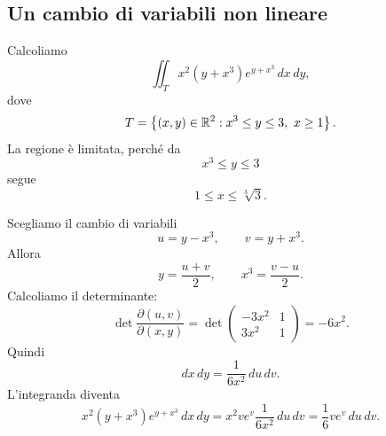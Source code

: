 \documentclass[a4paper]{article}
\begin{document}
\subsection{Un cambio di variabili non lineare}

\begin{snippetexample}{}
    Calcoliamo
    \[
        \iint_T x^2(y+x^3)e^{y+x^3}\,dx\,dy,
    \]
    dove
    \[
        T=
        \left\{
            (x,y)\in\mathbb{R}^2:
            x^3\leq y\leq 3,
            \ x\geq 1
        \right\}.
    \]
    La regione è limitata, perché da
    \[
        x^3\leq y\leq 3
    \]
    segue
    \[
        1\leq x\leq \sqrt[3]{3}.
    \]

    \begin{center}
    \end{center}

    Scegliamo il cambio di variabili
    \[
        u=y-x^3,
        \qquad
        v=y+x^3.
    \]
    Allora
    \[
        y=\frac{u+v}{2},
        \qquad
        x^3=\frac{v-u}{2}.
    \]
    Calcoliamo il determinante:
    \[
        \det
        \frac{\partial(u,v)}{\partial(x,y)}
        =
        \det
        \begin{pmatrix}
            -3x^2 & 1\\
            3x^2 & 1
        \end{pmatrix}
        =
        -6x^2.
    \]
    Quindi
    \[
        dx\,dy
        =
        \frac{1}{6x^2}\,du\,dv.
    \]
    L'integranda diventa
    \[
        x^2(y+x^3)e^{y+x^3}\,dx\,dy
        =
        x^2ve^v\frac{1}{6x^2}\,du\,dv
        =
        \frac{1}{6}ve^v\,du\,dv.
    \]


\end{snippetexample}
\end{document}
